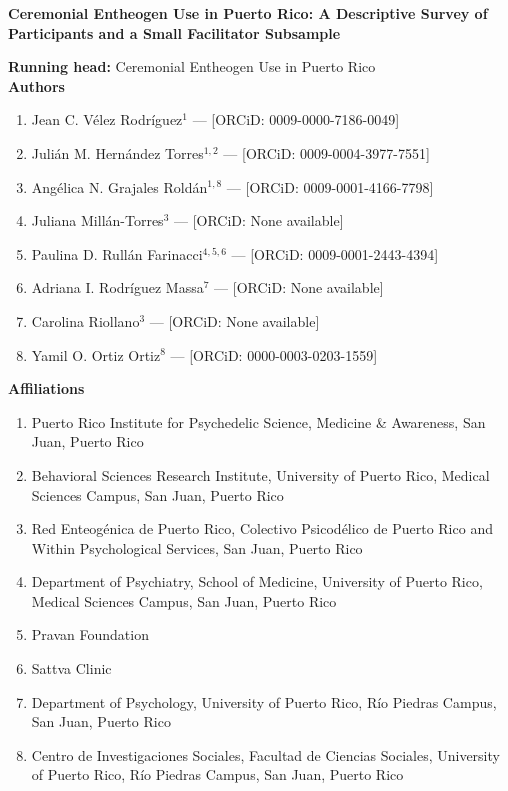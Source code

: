 \documentclass[12pt]{article}
\begin{document}
\pagestyle{empty}

\begin{center}
{\Large\bfseries Ceremonial Entheogen Use in Puerto Rico: A Descriptive Survey of Participants and a
Small Facilitator Subsample}
\end{center}

\vspace{1em}
\noindent\textbf{Running head:} Ceremonial Entheogen Use in Puerto Rico \\

\vspace{1.5em}
\noindent\textbf{Authors}

\begin{enumerate}
\setlength{\itemsep}{0.6em}
\item Jean C. V\'elez Rodr\'iguez$^{1}$ --- [ORCiD: 0009-0000-7186-0049]
\item Juli\'an M. Hern\'andez Torres$^{1,2}$ --- [ORCiD: 0009-0004-3977-7551]
\item Ang\'elica N. Grajales Rold\'an$^{1,8}$ --- [ORCiD: 0009-0001-4166-7798]
\item Juliana Mill\'an-Torres$^{3}$ --- [ORCiD: None available]
\item Paulina D. Rull\'an Farinacci$^{4,5,6}$ --- [ORCiD: 0009-0001-2443-4394]
\item Adriana I. Rodr\'iguez Massa$^{7}$ --- [ORCiD: None available]
\item Carolina Riollano$^{3}$ --- [ORCiD: None available]
\item Yamil O. Ortiz Ortiz$^{8}$ --- [ORCiD: 0000-0003-0203-1559]
\end{enumerate}

\vspace{1em}
\noindent\textbf{Affiliations}
\begin{enumerate}
\setlength{\itemsep}{0.3em}
\item[$^{1}$] Puerto Rico Institute for Psychedelic Science, Medicine \& Awareness, San Juan, Puerto Rico
\item[$^{2}$] Behavioral Sciences Research Institute, University of Puerto Rico, Medical Sciences Campus,
San Juan, Puerto Rico
\item[$^{3}$] Red Enteog\'enica de Puerto Rico, Colectivo Psicod\'elico de Puerto Rico and Within
Psychological Services, San Juan, Puerto Rico
\item[$^{4}$] Department of Psychiatry, School of Medicine, University of Puerto Rico, Medical Sciences
Campus, San Juan, Puerto Rico
\item[$^{5}$] Pravan Foundation
\item[$^{6}$] Sattva Clinic
\item[$^{7}$] Department of Psychology, University of Puerto Rico, R\'io Piedras Campus, San Juan, Puerto
Rico
\item[$^{8}$] Centro de Investigaciones Sociales, Facultad de Ciencias Sociales, University of Puerto
Rico, R\'io Piedras Campus, San Juan, Puerto Rico
\end{enumerate}
\end{document}
